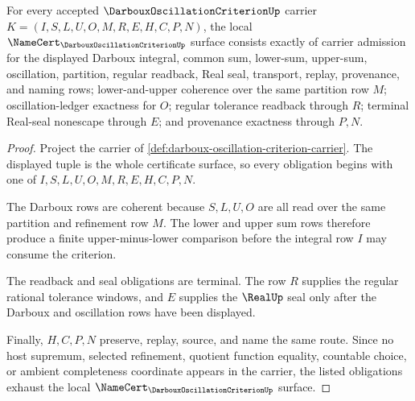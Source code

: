 \begin{theorem}
\label{thm:darboux-oscillation-criterion-namecert-obligations}
For every accepted $\DarbouxOscillationCriterionUp$ carrier $K=(I,S,L,U,O,M,R,E,H,C,P,N)$, the local $\NameCert_{\DarbouxOscillationCriterionUp}$ surface consists exactly of carrier admission for the displayed Darboux integral, common sum, lower-sum, upper-sum, oscillation, partition, regular readback, Real seal, transport, replay, provenance, and naming rows; lower-and-upper coherence over the same partition row $M$; oscillation-ledger exactness for $O$; regular tolerance readback through $R$; terminal Real-seal nonescape through $E$; and provenance exactness through $P,N$.
\end{theorem}
\begin{proof}
Project the carrier of \autoref{def:darboux-oscillation-criterion-carrier}. The displayed tuple is the whole certificate surface, so every obligation begins with one of $I,S,L,U,O,M,R,E,H,C,P,N$.

The Darboux rows are coherent because $S,L,U,O$ are all read over the same partition and refinement row $M$. The lower and upper sum rows therefore produce a finite upper-minus-lower comparison before the integral row $I$ may consume the criterion.

The readback and seal obligations are terminal. The row $R$ supplies the regular rational tolerance windows, and $E$ supplies the $\RealUp$ seal only after the Darboux and oscillation rows have been displayed.

Finally, $H,C,P,N$ preserve, replay, source, and name the same route. Since no host supremum, selected refinement, quotient function equality, countable choice, or ambient completeness coordinate appears in the carrier, the listed obligations exhaust the local $\NameCert_{\DarbouxOscillationCriterionUp}$ surface.
\end{proof}

